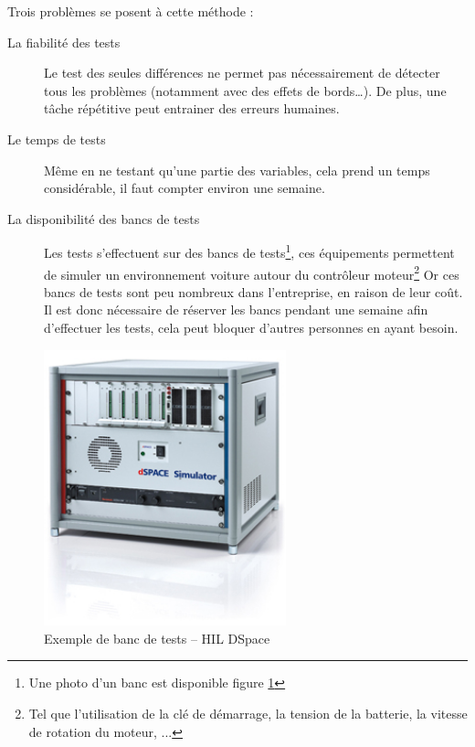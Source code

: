 	Trois problèmes se posent à cette méthode : 
	\begin{description}
		\item[La fiabilité des tests] Le test des seules différences ne permet pas nécessairement de détecter tous les problèmes (notamment avec des effets de bords…). De plus, une tâche répétitive peut entrainer des erreurs humaines.
		\item[Le temps de tests] Même en ne testant qu'une partie des variables, cela prend un temps considérable, il faut compter environ une semaine.
		\item[La disponibilité des bancs de tests]	Les tests s'effectuent sur des bancs de tests\footnote{Une photo d'un banc est disponible figure \ref{fig:photoHil}}, ces équipements permettent de simuler un environnement voiture autour du contrôleur moteur\footnote{Tel que l'utilisation de la clé de démarrage, la tension de la batterie, la vitesse de rotation du moteur, ...} Or ces bancs de tests sont peu nombreux dans l'entreprise, en raison de leur coût. Il est donc nécessaire de réserver les bancs pendant une semaine afin d'effectuer les tests, cela peut bloquer d'autres personnes en ayant besoin.
	\end{description}
	\begin{figure}[H]
		\centering
		\includegraphics[width=7cm]{contents/images/hil.jpg}
		\caption{Exemple de banc de tests -- HIL DSpace}
		\label{fig:photoHil}
	\end{figure}


